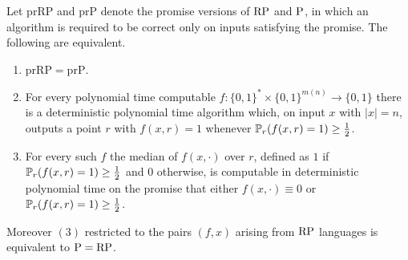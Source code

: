 \begin{theorem}
\label{thm:derandequiv}
Let $\mathrm{prRP}$ and $\mathrm{prP}$ denote the promise versions of $\mathrm{RP}$ and $\mathrm{P}$, in which an algorithm is required to be correct only on inputs satisfying the promise. The following are equivalent.
\begin{enumerate}
\item $\mathrm{prRP} = \mathrm{prP}$.
\item For every polynomial time computable $f : \{0,1\}^* \times \{0,1\}^{m(n)} \to \{0, 1\}$ there is a deterministic polynomial time algorithm which, on input $x$ with $|x| = n$, outputs a point $r$ with $f(x, r) = 1$ whenever $\mathbb{P}_r(f(x, r) = 1) \ge \tfrac12$.
\item For every such $f$ the median of $f(x, \cdot)$ over $r$, defined as $1$ if $\mathbb{P}_r(f(x,r) = 1) \ge \tfrac12$ and $0$ otherwise, is computable in deterministic polynomial time on the promise that either $f(x, \cdot) \equiv 0$ or $\mathbb{P}_r(f(x,r) = 1) \ge \tfrac12$.
\end{enumerate}
Moreover $(3)$ restricted to the pairs $(f, x)$ arising from $\mathrm{RP}$ languages is equivalent to $\mathrm{P} = \mathrm{RP}$.
\end{theorem}

